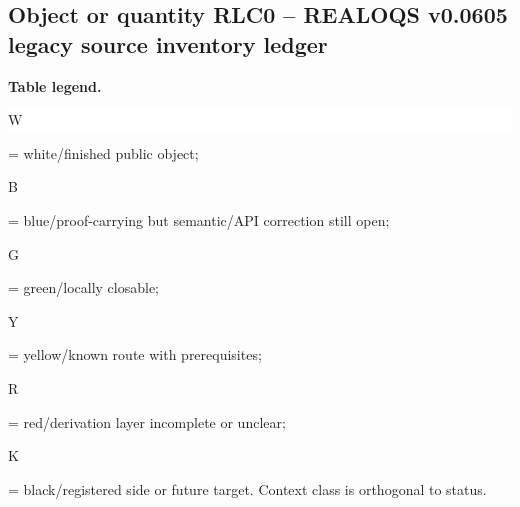 \subsection*{Object or quantity RLC0 -- REALOQS v0.0605 legacy source inventory ledger}
\hypertarget{objproof:RLC0}{}
\par\smallskip\noindent\begin{minipage}{0.99\linewidth}\footnotesize\raggedright\textbf{Table legend.} \colorbox{white}{\strut W} = white/finished public object; \colorbox{cyan!20}{\strut B} = blue/proof-carrying but semantic/API correction still open; \colorbox{green!18}{\strut G} = green/locally closable; \colorbox{yellow!25}{\strut Y} = yellow/known route with prerequisites; \colorbox{red!20}{\strut R} = red/derivation layer incomplete or unclear; \colorbox{black!18}{\strut K} = black/registered side or future target. Context class is orthogonal to status.\end{minipage}\par\vspace{0.25em}
